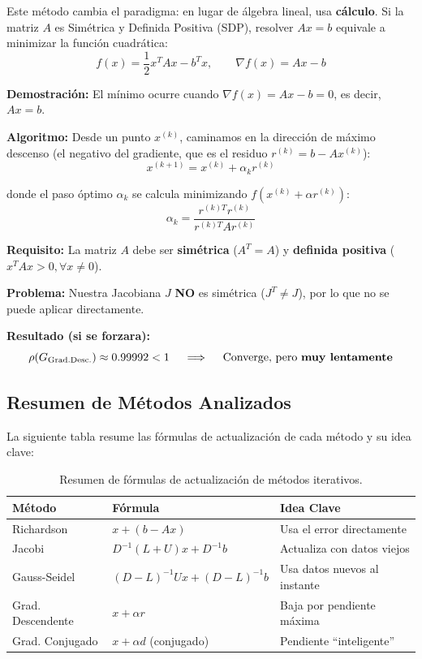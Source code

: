 \documentclass[11pt,letterpaper]{article}
\begin{document}
Este método cambia el paradigma: en lugar de álgebra lineal, usa \textbf{cálculo}. Si la matriz $A$ es Simétrica y Definida Positiva (SDP), resolver $Ax = b$ equivale a minimizar la función cuadrática:
\[
f(x) = \frac{1}{2}x^T A x - b^T x, \qquad \nabla f(x) = Ax - b
\]

\textbf{Demostración:} El mínimo ocurre cuando $\nabla f(x) = Ax - b = 0$, es decir, $Ax = b$.

\textbf{Algoritmo:} Desde un punto $x^{(k)}$, caminamos en la dirección de máximo descenso (el negativo del gradiente, que es el residuo $r^{(k)} = b - Ax^{(k)}$):
\[
x^{(k+1)} = x^{(k)} + \alpha_k r^{(k)}
\]

donde el paso óptimo $\alpha_k$ se calcula minimizando $f(x^{(k)} + \alpha r^{(k)})$:
\[
\alpha_k = \frac{r^{(k)T} r^{(k)}}{r^{(k)T} A r^{(k)}}
\]

\textbf{Requisito:} La matriz $A$ debe ser \textbf{simétrica} ($A^T = A$) y \textbf{definida positiva} ($x^T A x > 0, \forall x \neq 0$).

\textbf{Problema:} Nuestra Jacobiana $J$ \textbf{NO} es simétrica ($J^T \neq J$), por lo que no se puede aplicar directamente.

\textbf{Resultado (si se forzara):}
\[
\rho(G_{\text{Grad.Desc.}}) \approx 0.99992 < 1 \quad \implies \quad \text{Converge, pero \textbf{muy lentamente}}
\]

\subsection{Resumen de Métodos Analizados}

La siguiente tabla resume las fórmulas de actualización de cada método y su idea clave:

\begin{table}[H]
\centering
\begin{tabular}{|l|l|l|}
\hline
\textbf{Método} & \textbf{Fórmula} & \textbf{Idea Clave} \\
\hline
Richardson & $x + (b - Ax)$ & Usa el error directamente \\
Jacobi & $D^{-1}(L+U)x + D^{-1}b$ & Actualiza con datos viejos \\
Gauss-Seidel & $(D-L)^{-1}Ux + (D-L)^{-1}b$ & Usa datos nuevos al instante \\
Grad. Descendente & $x + \alpha r$ & Baja por pendiente máxima \\
Grad. Conjugado & $x + \alpha d$ (conjugado) & Pendiente ``inteligente'' \\
\hline
\end{tabular}
\caption{Resumen de fórmulas de actualización de métodos iterativos.}
\end{table}
\end{document}

